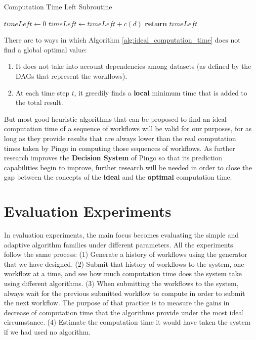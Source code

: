 \begin{algorithm}
\begin{singlespace}
\caption{Computation Time Left Subroutine}
\label{alg:computation_time_left}
\begin{algorithmic}[1]
	\State $timeLeft \gets 0$
			\State $timeLeft \gets timeLeft + c(d)$
		\EndIf
	\EndFor
	\State \textbf{return} $timeLeft$
\EndProcedure
\end{algorithmic}
\end{singlespace}
\end{algorithm}

There are to ways in which Algorithm \ref{alg:ideal_computation_time} does not find a global optimal value:
\begin{enumerate}
\item It does not take into account dependencies among datasets (as defined by the DAGs that represent the workflows).
\item At each time step $t$, it greedily finds a \textbf{local} minimum time that is added to the total result.
\end{enumerate}

But most good heuristic algorithms that can be proposed to find an ideal computation time of a sequence of workflows will be valid for our purposes, for as long as they provide results that are always lower than the real computation times taken by Pingo in computing those sequences of workflows.  As further research improves the \textbf{Decision System} of Pingo so that its prediction capabilities begin to improve, further research will be needed in order to close the gap between the concepts of the \textbf{ideal} and the \textbf{optimal} computation time.

\section{Evaluation Experiments}
In evaluation experiments, the main focus becomes evaluating the simple and adaptive algorithm families under different parameters.  All the experiments follow the same process:  (1) Generate a history of workflows using the generator that we have designed.  (2) Submit that history of workflows to the system, one workflow at a time, and see how much computation time does the system take using different algorithms. (3) When submitting the workflows to the system, always wait for the previous submitted workflow to compute in order to submit the next workflow. The purpose of that practice is to measure the gains in decrease of computation time that the algorithms provide under the most ideal circumstance. (4) Estimate the computation time it would have taken the system if we had used no algorithm.

